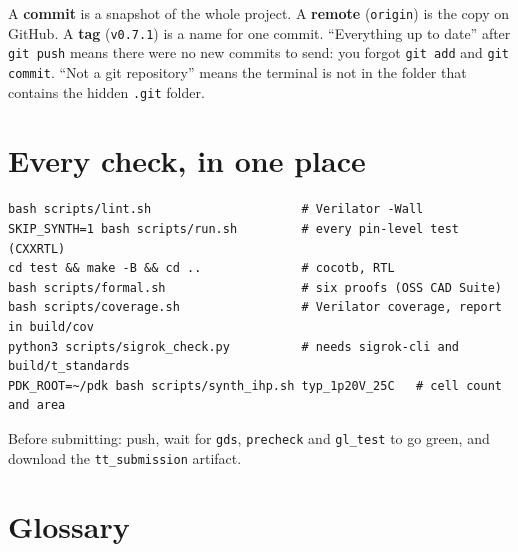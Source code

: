 \documentclass[11pt,a4paper]{article}
\newcommand{\file}[1]{\texttt{#1}}
\newcommand{\cmd}[1]{\texttt{#1}}
\begin{document}
A \textbf{commit} is a snapshot of the whole project. A \textbf{remote} (\texttt{origin}) is the copy on GitHub. A \textbf{tag} (\texttt{v0.7.1}) is a name for one commit. ``Everything up to date'' after \cmd{git push} means there were no new commits to send: you forgot \cmd{git add} and \cmd{git commit}. ``Not a git repository'' means the terminal is not in the folder that contains the hidden \file{.git} folder.

\section{Every check, in one place}

\begin{lstlisting}
bash scripts/lint.sh                     # Verilator -Wall
SKIP_SYNTH=1 bash scripts/run.sh         # every pin-level test (CXXRTL)
cd test && make -B && cd ..              # cocotb, RTL
bash scripts/formal.sh                   # six proofs (OSS CAD Suite)
bash scripts/coverage.sh                 # Verilator coverage, report in build/cov
python3 scripts/sigrok_check.py          # needs sigrok-cli and build/t_standards
PDK_ROOT=~/pdk bash scripts/synth_ihp.sh typ_1p20V_25C   # cell count and area
\end{lstlisting}

Before submitting: push, wait for \cmd{gds}, \texttt{precheck} and \texttt{gl\_test} to go green, and download the \texttt{tt\_submission} artifact.

\section*{Glossary}
\end{document}
